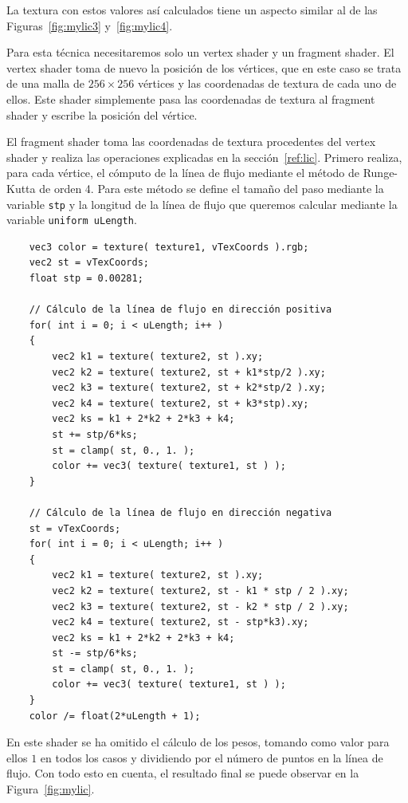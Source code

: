 La textura con estos valores así calculados tiene un aspecto similar al de las
Figuras~\ref{fig:mylic3} y~\ref{fig:mylic4}.

Para esta técnica necesitaremos solo un vertex shader y un fragment shader. El
vertex shader toma de nuevo la posición de los vértices, que en este caso se
trata de una malla de $256\times 256$ vértices y las coordenadas de textura de
cada uno de ellos. Este shader simplemente pasa las coordenadas de textura al
fragment shader y escribe la posición del vértice. 

El fragment shader toma las coordenadas de textura procedentes del vertex shader
y realiza las operaciones explicadas en la sección~\ref{ref:lic}. Primero
realiza, para cada vértice, el cómputo de la línea de flujo mediante el método
de Runge-Kutta de orden 4. Para este método se define el tamaño del paso
mediante la variable \verb|stp| y la longitud de la línea de flujo que queremos
calcular mediante la variable \verb|uniform uLength|.

\begin{verbatim}
    vec3 color = texture( texture1, vTexCoords ).rgb;
    vec2 st = vTexCoords;
    float stp = 0.00281;

    // Cálculo de la línea de flujo en dirección positiva
    for( int i = 0; i < uLength; i++ )
    {
        vec2 k1 = texture( texture2, st ).xy;
        vec2 k2 = texture( texture2, st + k1*stp/2 ).xy;
        vec2 k3 = texture( texture2, st + k2*stp/2 ).xy;
        vec2 k4 = texture( texture2, st + k3*stp).xy;
        vec2 ks = k1 + 2*k2 + 2*k3 + k4;
        st += stp/6*ks;
        st = clamp( st, 0., 1. );
        color += vec3( texture( texture1, st ) );
    }

    // Cálculo de la línea de flujo en dirección negativa
    st = vTexCoords;
    for( int i = 0; i < uLength; i++ )
    {
        vec2 k1 = texture( texture2, st ).xy;
        vec2 k2 = texture( texture2, st - k1 * stp / 2 ).xy;
        vec2 k3 = texture( texture2, st - k2 * stp / 2 ).xy;
        vec2 k4 = texture( texture2, st - stp*k3).xy;
        vec2 ks = k1 + 2*k2 + 2*k3 + k4;
        st -= stp/6*ks;
        st = clamp( st, 0., 1. );
        color += vec3( texture( texture1, st ) );
    }
    color /= float(2*uLength + 1); 
\end{verbatim}

En este shader se ha omitido el cálculo de los pesos, tomando como valor para
ellos $1$ en todos los casos y dividiendo por el número de puntos en la línea
de flujo. Con todo esto en cuenta, el resultado final se puede observar en la
Figura~\ref{fig:mylic}.


